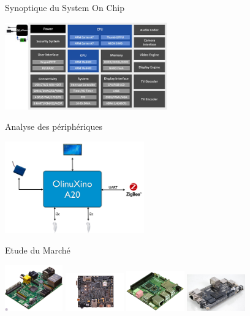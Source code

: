 \documentclass[11pt]{beamer}
\begin{document}
	\begin{frame}[label=SoC]{Synoptique du System On Chip}
	 \begin{center}
		\includegraphics[width=7cm]{common/SoC.png}
	 \end{center}
	\hyperlink{choix}{}
	\end{frame}
	
	\begin{frame}[label=SbC]{Analyse des périphériques}
	 \begin{center}
		\includegraphics[width=6cm]{common/Periph.png}
	 \end{center}
	\hyperlink{choix}{}
	\end{frame}
	
	\begin{frame}[label=SbC_2]{Etude du Marché}
	 \begin{center}
		\includegraphics[width=2.5cm]{common/rpi.jpg}
		\includegraphics[width=2.5cm]{common/Panda.png}
		\includegraphics[width=2.5cm]{common/odroid.jpg}
		\includegraphics[width=2.5cm]{common/Cubieboard.jpeg}
	 \end{center}
	\hyperlink{choix}{}
	\end{frame}
	
\end{document}

